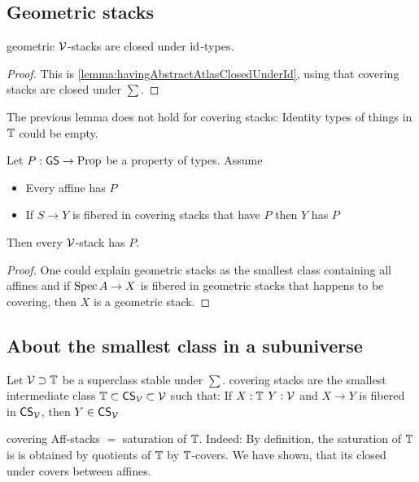 \documentclass{article}
\newcommand{\CS}{\mathsf{CS}}
\renewcommand{\GS}{\mathsf{GS}}
\begin{document}
\subsection{Geometric stacks}

\begin{lemma}{\label{lemma:geometricStacksClosedUnderId}}
	geometric $\mathcal{V}$-stacks are closed under $\operatorname{id}$-types.
\end{lemma}
\begin{proof}
	
	This is \ref{lemma:havingAbstractAtlasClosedUnderId}, using that covering stacks are closed under $\sum$.
\end{proof}

\begin{warning}
	The previous lemma does not hold for covering stacks: Identity types of things in $\mathbb{T}$ could be empty.
\end{warning}
\begin{prop}
	Let $P : \GS \to \Prop$ be a property of types. Assume
	\begin{itemize}
		\item Every affine has $P$
		\item If $S \to Y$ is fibered in covering stacks that have $P$ then $Y$ has $P$
	\end{itemize}
	Then every $\mathcal{V}$-stack has $P$.
\end{prop}
\begin{proof}
	One could explain geometric stacks as the smallest class containing all affines and if $\operatorname{Spec} A \to X$ is fibered in geometric stacks that happens to be covering, then $X$ is a geometric stack.
\end{proof}
\subsection{About the smallest class in a subuniverse}
\begin{definition}
	Let $\mathcal{V} \supset \mathbb{T}$ be a superclass stable under $\sum$. covering stacks are the smallest intermediate class $\bT \subset \CS_\cV \subset \cV$ such that: If $X : \mathbb{T}$  $Y : \mathcal{V}$ and $X \to Y$ is fibered in $\CS_\cV$, then $Y \in \CS_\cV$
\end{definition}
\begin{example}
	covering Aff-stacks $=$ saturation of $\mathbb{T}$. Indeed: By definition, the saturation of $\mathbb{T}$ is is obtained by quotients of $\mathbb{T}$ by $\mathbb{T}$-covers. We have shown, that its closed under covers between affines.
\end{example}
\end{document}

